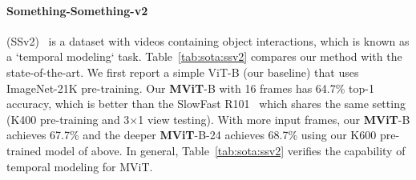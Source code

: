 \documentclass[10pt,twocolumn,letterpaper]{article}
\newcommand{\tblref}[1]{Table~\ref{#1}}
\def\x{$\times$}
\begin{document}
\paragraph{Something-Something-v2} (SSv2)~\cite{ssv2} is a dataset with videos containing object interactions, which is known as a `temporal modeling` task.  \tblref{tab:sota:ssv2} compares our method with the state-of-the-art. We first report a simple ViT-B (our baseline) that uses ImageNet-21K pre-training. 
Our \textbf{MViT}-B with 16 frames has 64.7\% top-1 accuracy, which is better than the SlowFast R101~\cite{Feichtenhofer2019} which shares the same setting (K400 pre-training and 3\x1 view testing). With more input frames, our \textbf{MViT}-B achieves 67.7\% and the deeper \mbox{\textbf{MViT}-B-24} achieves 68.7\% using our K600 pre-trained model of above. %
In general, \tblref{tab:sota:ssv2} verifies the capability of temporal modeling for MViT.
\end{document}
